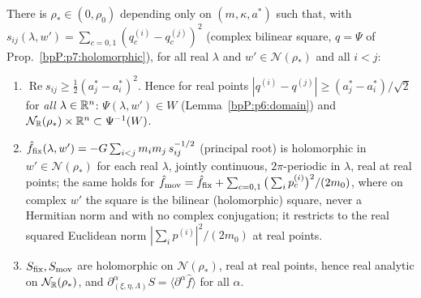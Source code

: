 \begin{proposition}\label{bpP:p8:perturbation-analytic}
There is $\rho_*\in(0,\rho_0)$ depending only on $(m,\kappa,a^*)$ such that, with $s_{ij}(\lambda,w')=\sum_{c=0,1}(q^{(i)}_c-q^{(j)}_c)^2$ (complex bilinear square, $q=\Psi$ of Prop.~\ref{bpP:p7:holomorphic}), for all real $\lambda$ and $w'\in\mathcal N(\rho_*)$ and all $i<j$:
\begin{enumerate}[label=(\alph*)]
\item $\operatorname{Re}s_{ij}\ge\tfrac12(a_j^*-a_i^*)^2$. Hence for real points $|q^{(i)}-q^{(j)}|\ge(a_j^*-a_i^*)/\sqrt2$ for \emph{all} $\lambda\in\mathbb{R}^n$: $\Psi(\lambda,w')\in W$ (Lemma~\ref{bpP:p6:domain}) and $\mathcal N_{\mathbb{R}}(\rho_*)\times\mathbb{R}^n\subset\Psi^{-1}(W)$.
\item $\hat f_{\rm fix}(\lambda,w')=-G\sum_{i<j}m_im_j\,s_{ij}^{-1/2}$ (principal root) is holomorphic in $w'\in\mathcal N(\rho_*)$ for each real $\lambda$, jointly continuous, $2\pi$-periodic in $\lambda$, real at real points; the same holds for $\hat f_{\rm mov}=\hat f_{\rm fix}+\sum_{c=0,1}\big(\sum_ip^{(i)}_c\big)^2/(2m_0)$, where on complex $w'$ the square is the bilinear (holomorphic) square, never a Hermitian norm and with no complex conjugation; it restricts to the real squared Euclidean norm $|\sum_ip^{(i)}|^2/(2m_0)$ at real points.
\item $S_{\rm fix},S_{\rm mov}$ are holomorphic on $\mathcal N(\rho_*)$, real at real points, hence real analytic on $\mathcal N_{\mathbb{R}}(\rho_*)$, and $\partial^\alpha_{(\xi,\eta,\Lambda)}S=\langle\partial^\alpha\hat f\rangle$ for all $\alpha$.
\end{enumerate}
\end{proposition}
